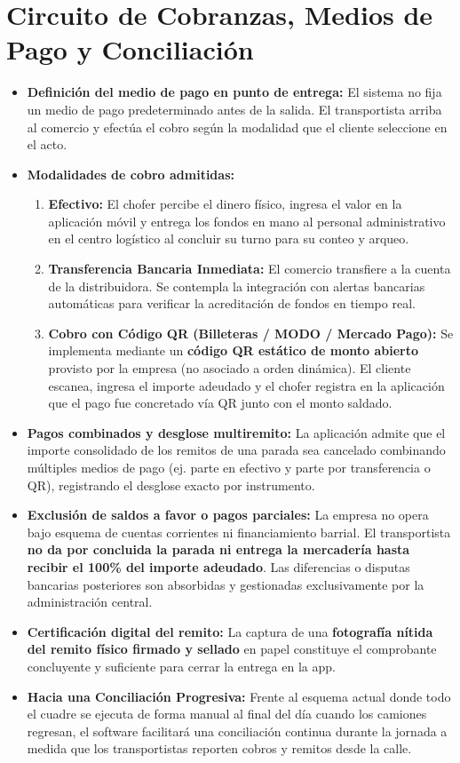 \documentclass[11pt,a4paper]{article}
\begin{document}
\section{Circuito de Cobranzas, Medios de Pago y Conciliación}

\begin{itemize}
  \item \textbf{Definición del medio de pago en punto de entrega:} El sistema no fija un medio de pago predeterminado antes de la salida. El transportista arriba al comercio y efectúa el cobro según la modalidad que el cliente seleccione en el acto.
  \item \textbf{Modalidades de cobro admitidas:}
  \begin{enumerate}
    \item \textbf{Efectivo:} El chofer percibe el dinero físico, ingresa el valor en la aplicación móvil y entrega los fondos en mano al personal administrativo en el centro logístico al concluir su turno para su conteo y arqueo.
    \item \textbf{Transferencia Bancaria Inmediata:} El comercio transfiere a la cuenta de la distribuidora. Se contempla la integración con alertas bancarias automáticas para verificar la acreditación de fondos en tiempo real.
    \item \textbf{Cobro con Código QR (Billeteras / MODO / Mercado Pago):} Se implementa mediante un \textbf{código QR estático de monto abierto} provisto por la empresa (no asociado a orden dinámica). El cliente escanea, ingresa el importe adeudado y el chofer registra en la aplicación que el pago fue concretado vía QR junto con el monto saldado.
  \end{enumerate}
  \item \textbf{Pagos combinados y desglose multiremito:} La aplicación admite que el importe consolidado de los remitos de una parada sea cancelado combinando múltiples medios de pago (ej. parte en efectivo y parte por transferencia o QR), registrando el desglose exacto por instrumento.
  \item \textbf{Exclusión de saldos a favor o pagos parciales:} La empresa no opera bajo esquema de cuentas corrientes ni financiamiento barrial. El transportista \textbf{no da por concluida la parada ni entrega la mercadería hasta recibir el 100\% del importe adeudado}. Las diferencias o disputas bancarias posteriores son absorbidas y gestionadas exclusivamente por la administración central.
  \item \textbf{Certificación digital del remito:} La captura de una \textbf{fotografía nítida del remito físico firmado y sellado} en papel constituye el comprobante concluyente y suficiente para cerrar la entrega en la app.
  \item \textbf{Hacia una Conciliación Progresiva:} Frente al esquema actual donde todo el cuadre se ejecuta de forma manual al final del día cuando los camiones regresan, el software facilitará una conciliación continua durante la jornada a medida que los transportistas reporten cobros y remitos desde la calle.
\end{itemize}
\end{document}
